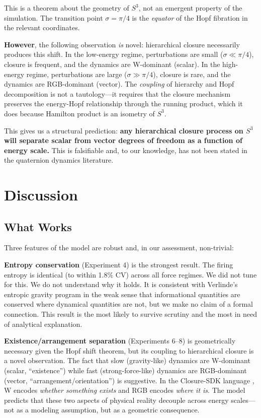 \documentclass[letterpaper,12pt]{article}
\begin{document}
This is a theorem about the geometry of $S^3$, not an emergent property of the simulation. The transition point $\sigma = \pi/4$ is the \emph{equator} of the Hopf fibration in the relevant coordinates.

\textbf{However}, the following observation \emph{is} novel: hierarchical closure necessarily produces this shift. In the low-energy regime, perturbations are small ($\sigma \ll \pi/4$), closure is frequent, and the dynamics are W-dominant (scalar). In the high-energy regime, perturbations are large ($\sigma \gg \pi/4$), closure is rare, and the dynamics are RGB-dominant (vector). The \emph{coupling} of hierarchy and Hopf decomposition is not a tautology---it requires that the closure mechanism preserves the energy-Hopf relationship through the running product, which it does because Hamilton product is an isometry of $S^3$.

This gives us a structural prediction: \textbf{any hierarchical closure process on $S^3$ will separate scalar from vector degrees of freedom as a function of energy scale.} This is falsifiable and, to our knowledge, has not been stated in the quaternion dynamics literature.

\section{Discussion}

\subsection{What Works}

Three features of the model are robust and, in our assessment, non-trivial:

\textbf{Entropy conservation} (Experiment 4) is the strongest result. The firing entropy is identical (to within 1.8\% CV) across all force regimes. We did not tune for this. We do not understand why it holds. It is consistent with Verlinde's entropic gravity program \cite{Verlinde2011} in the weak sense that informational quantities are conserved where dynamical quantities are not, but we make no claim of a formal connection. This result is the most likely to survive scrutiny and the most in need of analytical explanation.

\textbf{Existence/arrangement separation} (Experiments 6--8) is geometrically necessary given the Hopf shift theorem, but its coupling to hierarchical closure is a novel observation. The fact that slow (gravity-like) dynamics are W-dominant (scalar, ``existence'') while fast (strong-force-like) dynamics are RGB-dominant (vector, ``arrangement/orientation'') is suggestive. In the Closure-SDK language \cite{daSilva2025}, W encodes \emph{whether something exists} and RGB encodes \emph{where it is}. The model predicts that these two aspects of physical reality decouple across energy scales---not as a modeling assumption, but as a geometric consequence.
\end{document}
